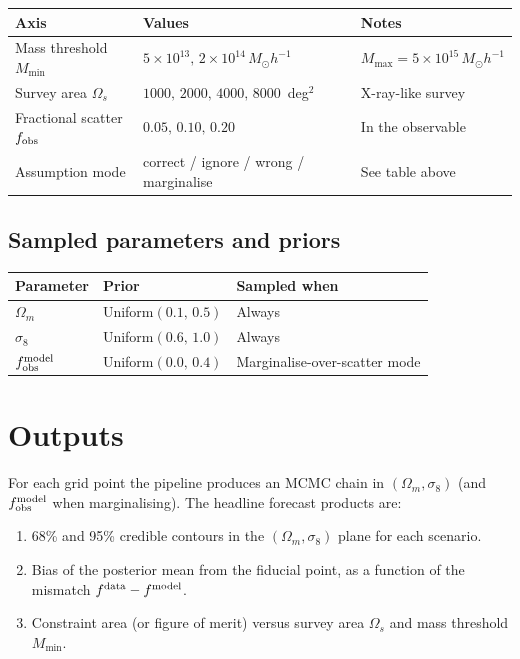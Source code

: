\documentclass[11pt,a4paper]{article}
\begin{document}
\begin{center}
\begin{tabular}{lll}
\toprule
Axis                                  & Values                                       & Notes                                                \\
\midrule
Mass threshold $M_{\min}$             & $5{\times}10^{13},\, 2{\times}10^{14}\,M_\odot h^{-1}$  & $M_{\max} = 5{\times}10^{15}\,M_\odot h^{-1}$        \\
Survey area $\Omega_s$                & $1000,\, 2000,\, 4000,\, 8000$~deg$^2$        & X-ray-like survey                                    \\
Fractional scatter $f_{\rm obs}$      & $0.05,\, 0.10,\, 0.20$                        & In the observable                                    \\
Assumption mode                       & correct / ignore / wrong / marginalise        & See table above                                      \\
\bottomrule
\end{tabular}
\end{center}

\subsection{Sampled parameters and priors}

\begin{center}
\begin{tabular}{lll}
\toprule
Parameter          & Prior                     & Sampled when                       \\
\midrule
$\Omega_m$         & Uniform$(0.1,\, 0.5)$     & Always                             \\
$\sigma_8$         & Uniform$(0.6,\, 1.0)$     & Always                             \\
$f_{\rm obs}^{\rm model}$ & Uniform$(0.0,\, 0.4)$ & Marginalise-over-scatter mode      \\
\bottomrule
\end{tabular}
\end{center}

\section{Outputs}

For each grid point the pipeline produces an MCMC chain in
$(\Omega_m, \sigma_8)$ (and $f_{\rm obs}^{\rm model}$ when
marginalising). The headline forecast products are:
\begin{enumerate}
    \item 68\% and 95\% credible contours in the $(\Omega_m, \sigma_8)$
          plane for each scenario.
    \item Bias of the posterior mean from the fiducial point, as a
          function of the mismatch $f^{\rm data} - f^{\rm model}$.
    \item Constraint area (or figure of merit) versus survey area
          $\Omega_s$ and mass threshold $M_{\min}$.
\end{enumerate}
\end{document}
